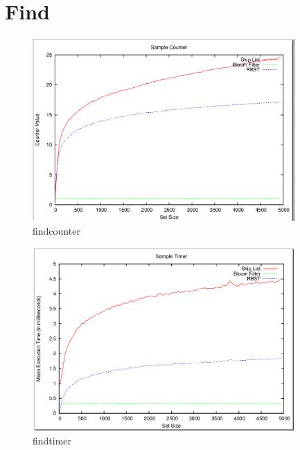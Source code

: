 \documentclass[11pt]{article}
\begin{document}
\section{Find}
\begin{figure}[ht]
\centering
\includegraphics[height=70mm,width=100mm]{findcounter.png}
\caption{findcounter}
\end{figure}
\begin{figure}[ht]
\centering
\includegraphics[height=70mm,width=100mm]{findtimer.png}
\caption{findtimer}
\end{figure}
\end{document}
